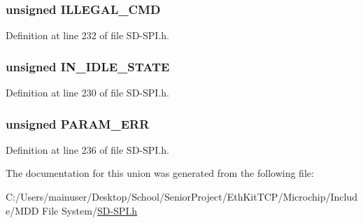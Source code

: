 \hypertarget{union_r_e_s_p_o_n_s_e__1_ad0ff111a5b1536c0a0929f4d4abe187f}{}
\subsubsection[{I\+L\+L\+E\+G\+A\+L\+\_\+\+C\+M\+D}]{\setlength{\rightskip}{0pt plus 5cm}unsigned I\+L\+L\+E\+G\+A\+L\+\_\+\+C\+M\+D}\label{union_r_e_s_p_o_n_s_e__1_ad0ff111a5b1536c0a0929f4d4abe187f}


Definition at line 232 of file S\+D-\/\+S\+P\+I.\+h.

\hypertarget{union_r_e_s_p_o_n_s_e__1_aacd57ecac9535b8bbec237cd7b8f1d5b}{}
\subsubsection[{I\+N\+\_\+\+I\+D\+L\+E\+\_\+\+S\+T\+A\+T\+E}]{\setlength{\rightskip}{0pt plus 5cm}unsigned I\+N\+\_\+\+I\+D\+L\+E\+\_\+\+S\+T\+A\+T\+E}\label{union_r_e_s_p_o_n_s_e__1_aacd57ecac9535b8bbec237cd7b8f1d5b}


Definition at line 230 of file S\+D-\/\+S\+P\+I.\+h.

\hypertarget{union_r_e_s_p_o_n_s_e__1_a22dcbf2add4c812de207ef9a507758e3}{}
\subsubsection[{P\+A\+R\+A\+M\+\_\+\+E\+R\+R}]{\setlength{\rightskip}{0pt plus 5cm}unsigned P\+A\+R\+A\+M\+\_\+\+E\+R\+R}\label{union_r_e_s_p_o_n_s_e__1_a22dcbf2add4c812de207ef9a507758e3}


Definition at line 236 of file S\+D-\/\+S\+P\+I.\+h.



The documentation for this union was generated from the following file\+:\begin{DoxyCompactItemize}
\item 
C\+:/\+Users/mainuser/\+Desktop/\+School/\+Senior\+Project/\+Eth\+Kit\+T\+C\+P/\+Microchip/\+Include/\+M\+D\+D File System/\hyperlink{_s_d-_s_p_i_8h}{S\+D-\/\+S\+P\+I.\+h}\end{DoxyCompactItemize}
